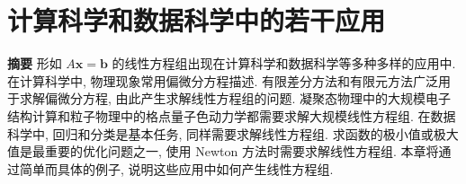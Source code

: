 \clearpage
\section{{计算科学和数据科学中的若干应用}}\label{chap:computational-applications}\label{srcpage:printed-31}
\setcounter{footnote}{0}
\noindent\textbf{{摘要}}\quad
{形如 $A\boldsymbol{x}=\boldsymbol{b}$ 的线性方程组出现在计算科学和数据科学等多种多样的应用中. 在计算科学中, 物理现象常用偏微分方程描述. 有限差分方法和有限元方法广泛用于求解偏微分方程, 由此产生求解线性方程组的问题. 凝聚态物理中的大规模电子结构计算和粒子物理中的格点量子色动力学都需要求解大规模线性方程组. 在数据科学中, 回归和分类是基本任务, 同样需要求解线性方程组. 求函数的极小值或极大值是最重要的优化问题之一, 使用 Newton 方法时需要求解线性方程组. 本章将通过简单而具体的例子, 说明这些应用中如何产生线性方程组.}
